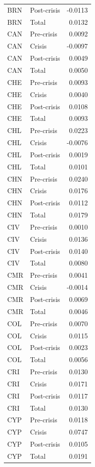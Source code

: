 \begin{longtable}[t]{llr}
BRN & Post-crisis & -0.0113\\
\addlinespace
BRN & Total & 0.0132\\
CAN & Pre-crisis & 0.0092\\
CAN & Crisis & -0.0097\\
CAN & Post-crisis & 0.0049\\
CAN & Total & 0.0050\\
\addlinespace
CHE & Pre-crisis & 0.0093\\
CHE & Crisis & 0.0040\\
CHE & Post-crisis & 0.0108\\
CHE & Total & 0.0093\\
CHL & Pre-crisis & 0.0223\\
\addlinespace
CHL & Crisis & -0.0076\\
CHL & Post-crisis & 0.0019\\
CHL & Total & 0.0101\\
CHN & Pre-crisis & 0.0240\\
CHN & Crisis & 0.0176\\
\addlinespace
CHN & Post-crisis & 0.0112\\
CHN & Total & 0.0179\\
CIV & Pre-crisis & 0.0010\\
CIV & Crisis & 0.0136\\
CIV & Post-crisis & 0.0140\\
\addlinespace
CIV & Total & 0.0080\\
CMR & Pre-crisis & 0.0041\\
CMR & Crisis & -0.0014\\
CMR & Post-crisis & 0.0069\\
CMR & Total & 0.0046\\
\addlinespace
COL & Pre-crisis & 0.0070\\
COL & Crisis & 0.0115\\
COL & Post-crisis & 0.0023\\
COL & Total & 0.0056\\
CRI & Pre-crisis & 0.0130\\
\addlinespace
CRI & Crisis & 0.0171\\
CRI & Post-crisis & 0.0117\\
CRI & Total & 0.0130\\
CYP & Pre-crisis & 0.0118\\
CYP & Crisis & 0.0747\\
\addlinespace
CYP & Post-crisis & 0.0105\\
CYP & Total & 0.0191\\

\end{longtable}
